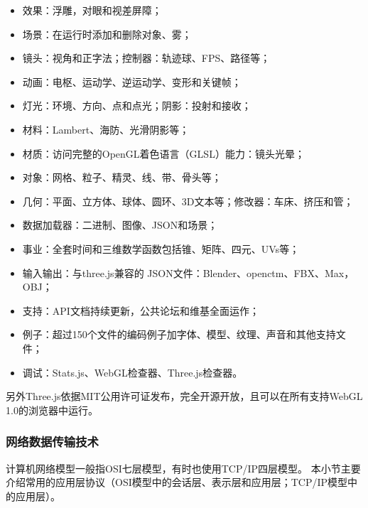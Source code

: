 \begin{itemize}
    \begin{itemize}
        \item 效果：浮雕，对眼和视差屏障；
        \item 场景：在运行时添加和删除对象、雾；
        \item 镜头：视角和正字法；控制器：轨迹球、FPS、路径等；
        \item 动画：电枢、运动学、逆运动学、变形和关键帧；
        \item 灯光：环境、方向、点和点光；阴影：投射和接收；
        \item 材料：Lambert、海防、光滑阴影等；
        \item 材质：访问完整的OpenGL着色语言（GLSL）能力：镜头光晕；
        \item 对象：网格、粒子、精灵、线、带、骨头等；
        \item 几何：平面、立方体、球体、圆环、3D文本等；修改器：车床、挤压和管；
        \item 数据加载器：二进制、图像、JSON和场景；
        \item 事业：全套时间和三维数学函数包括锥、矩阵、四元、UVs等；
        \item 输入输出：与three.js兼容的 JSON文件：Blender、openctm、FBX、Max，OBJ；
        \item 支持：API文档持续更新，公共论坛和维基全面运作；
        \item 例子：超过150个文件的编码例子加字体、模型、纹理、声音和其他支持文件；
        \item 调试：Stats.js、WebGL检查器、Three.js检查器。
    \end{itemize}

    另外Three.js依据MIT公用许可证发布，完全开源开放，且可以在所有支持WebGL 1.0的浏览器中运行。

\end{itemize}

\subsubsection{网络数据传输技术}

计算机网络模型一般指OSI七层模型，有时也使用TCP/IP四层模型。
本小节主要介绍常用的应用层协议（OSI模型中的会话层、表示层和应用层；TCP/IP模型中的应用层）。

